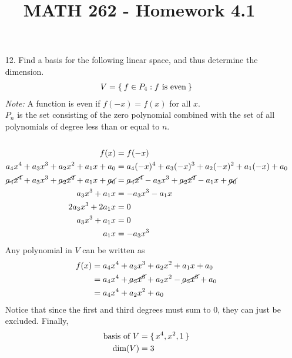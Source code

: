 \documentclass[letterpaper,12pt]{article}
\author{}
\title{MATH 262 - Homework 4.1}
\date{} %
\begin{document}
\maketitle

\begin{enumerate}
  \item[12.]
    Find a basis for the following linear space, and thus determine the dimension.
    \begin{align*}
      V = \Set{f \in P_4 : f \ \text{is even}}
    \end{align*}
    \textit{Note:} A function is even if $f(-x) = f(x)$ for all $x$. \\
    $P_n$ is the set consisting of the zero polynomial combined with the set of all polynomials of degree less than or equal to $n$. \\
    \\
    \begin{align*}
       f(x) &= f(-x) \\
       a_4x^4 + a_3x^3 + a_2x^2 + a_1x + a_0 &= a_4(-x)^4 + a_3(-x)^3 + a_2(-x)^2 + a_1(-x) + a_0 \\
       \cancel{a_4x^4} + a_3x^3 + \cancel{a_2x^2} + a_1x + \cancel{a_0} &= \cancel{a_4x^4} - a_3x^3 + \cancel{a_2x^2} - a_1x + \cancel{a_0} \\
       a_3x^3 + a_1x &= -a_3x^3 - a_1x \\
       2a_3x^3 + 2a_1x &= 0 \\
       a_3x^3 + a_1x &= 0 \\
       a_1x &= -a_3x^3
    \end{align*}
    Any polynomial in $V$ can be written as
    \begin{align*}
      f(x) &= a_4x^4 + a_3x^3 + a_2x^2 + a_1x + a_0 \\
      &= a_4x^4 + \cancel{a_3x^3} + a_2x^2 - \cancel{a_3x^3} + a_0 \\
      &= a_4x^4 + a_2x^2 + a_0
    \end{align*}
    Notice that since the first and third degrees must sum to 0, they can just be excluded. Finally,
    \begin{align*}
      \text{basis of} \ V &= \set{x^4, x^2, 1} \\
      \text{dim}(V) &= 3
    \end{align*}
\end{enumerate}
\end{document}
